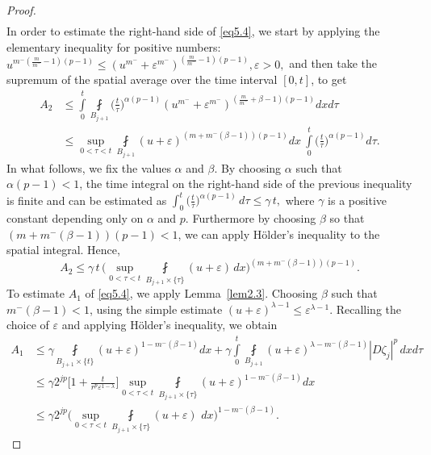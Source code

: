 \documentclass[10pt,a4paper]{amsart}
\begin{document}
\begin{proof}
\begin{align}
\end{align}
In order to estimate the right-hand side of \eqref{eq5.4}, we start by applying the elementary inequality for positive numbers: $u^{m^-(\frac{m}{m^-}-1)(p-1)} 
\leqslant(u^{m^-}+\varepsilon^{m^-})^{(\frac{m}{m^-}-1)(p-1)}, \varepsilon>0, $ and then take the supremum of the spatial average over the time interval $[0,t]$, to get
\begin{align*}
A_2&\leqslant\int\limits_0^{t}\fint\limits_{B_{j+1}}\Big(\frac{t}{\tau}\Big)^{\alpha(p-1)} (u^{m^{-}}+\varepsilon^{m^{-}})^{(\frac{m}{m^{-}}+\beta -1)(p-1)} dx d\tau
\\&\leqslant \sup\limits_{0<\tau<t}\fint\limits_{B_{j+1}}(u+\varepsilon)^{(m+m^{-}(\beta -1))(p-1)} dx \ \int\limits_0^t \Big(\frac{t}{\tau}\Big)^{\alpha(p-1)} d\tau.
\end{align*}
In what follows, we fix the values $\alpha$ and $\beta$. By choosing $\alpha$ such that $\alpha(p-1)<1$, the time integral on the right-hand side of the previous inequality is finite and can be estimated as
$\int_0^t \Big(\frac{t}{\tau}\Big)^{\alpha(p-1)}\, d\tau 
\leqslant \gamma\, t,$
where $\gamma$ is a positive constant depending only on $\alpha$ and $p$. Furthermore by choosing $\beta$ so that $(m+m^-(\beta-1))(p-1)<1$,  we can apply H\"older's inequality to the spatial integral. Hence,
\begin{equation}\label{eq5.5}
A_2\leqslant \gamma \,t \,\Big(\sup\limits_{0<\tau<t}\fint\limits_{ B_{j+1}\times \{\tau\}}(u+\varepsilon) \,dx\Big)^{(m+m^{-}(\beta -1))(p-1)}.
\end{equation}
To estimate $A_1$ of \eqref{eq5.4}, we apply Lemma~\ref{lem2.3}. 
Choosing $\beta$ such that $m^{-}(\beta-1)<1$,  using the simple estimate   $(u+\varepsilon)^{\lambda-1}\leqslant \varepsilon^{\lambda-1}$. Recalling the choice of $\varepsilon$
 and applying H\"older's inequality, we obtain
\begin{equation}\label{eq5.6}
\begin{aligned}
A_1&\leqslant \gamma\fint\limits_{B_{j+1}\times\{t\}}(u+\varepsilon)^{1-m^-(\beta-1)} dx+\gamma \int\limits_0^t\fint\limits_{B_{j+1}}
(u+\varepsilon)^{\lambda-m^-(\beta-1)}|D \zeta_{j}|^{p}\,dxd\tau\\
&\leqslant \gamma 2^{jp}\bigg[1+ \frac{t}{r^{p}\varepsilon^{1-\lambda}}\bigg]\sup\limits_{0<\tau<t}\fint\limits_{B_{j+1}\times\{\tau\}}
(u+\varepsilon)^{1-m^-(\beta-1)} dx\\&\leqslant \gamma 2^{jp}
\Big(\sup\limits_{0<\tau<t}\fint\limits_{B_{j+1}\times\{\tau\}}(u+\varepsilon)\,\, dx\Big)^{1-m^-(\beta-1)}.

\end{aligned}
\end{equation}
\end{proof}
\end{document}
